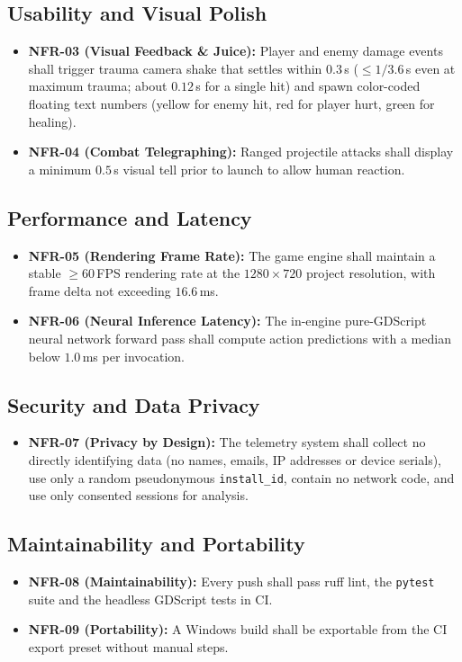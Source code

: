 \subsection{Usability and Visual Polish}
\begin{itemize}
    \item \textbf{NFR-03 (Visual Feedback \& Juice):} Player and enemy damage events shall trigger trauma camera shake that settles within $0.3$\,s ($\le 1/3.6$\,s even at maximum trauma; about $0.12$\,s for a single hit) and spawn color-coded floating text numbers (yellow for enemy hit, red for player hurt, green for healing).
    \item \textbf{NFR-04 (Combat Telegraphing):} Ranged projectile attacks shall display a minimum $0.5$\,s visual tell prior to launch to allow human reaction.
\end{itemize}

\subsection{Performance and Latency}
\begin{itemize}
    \item \textbf{NFR-05 (Rendering Frame Rate):} The game engine shall maintain a stable $\ge 60$\,FPS rendering rate at the $1280\times720$ project resolution, with frame delta not exceeding $16.6$\,ms.
    \item \textbf{NFR-06 (Neural Inference Latency):} The in-engine pure-GDScript neural network forward pass shall compute action predictions with a median below $1.0$\,ms per invocation.
\end{itemize}

\subsection{Security and Data Privacy}
\begin{itemize}
    \item \textbf{NFR-07 (Privacy by Design):} The telemetry system shall collect no directly identifying data (no names, emails, IP addresses or device serials), use only a random pseudonymous \texttt{install\_id}, contain no network code, and use only consented sessions for analysis.
\end{itemize}

\subsection{Maintainability and Portability}
\begin{itemize}
    \item \textbf{NFR-08 (Maintainability):} Every push shall pass ruff lint, the \texttt{pytest} suite and the headless GDScript tests in CI.
    \item \textbf{NFR-09 (Portability):} A Windows build shall be exportable from the CI export preset without manual steps.
\end{itemize}

